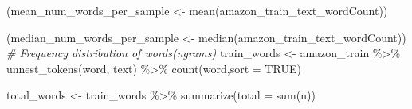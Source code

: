 \documentclass[
]{article}
\newenvironment{Shaded}{}{}
\newcommand{\AttributeTok}[1]{\textcolor[rgb]{0.49,0.56,0.16}{#1}}
\newcommand{\CommentTok}[1]{\textcolor[rgb]{0.38,0.63,0.69}{\textit{#1}}}
\newcommand{\ConstantTok}[1]{\textcolor[rgb]{0.53,0.00,0.00}{#1}}
\newcommand{\FunctionTok}[1]{\textcolor[rgb]{0.02,0.16,0.49}{#1}}
\newcommand{\NormalTok}[1]{#1}
\newcommand{\OtherTok}[1]{\textcolor[rgb]{0.00,0.44,0.13}{#1}}
\newcommand{\SpecialCharTok}[1]{\textcolor[rgb]{0.25,0.44,0.63}{#1}}
\begin{document}
\begin{Shaded}
\begin{Highlighting}[]
\NormalTok{(mean\_num\_words\_per\_sample }\OtherTok{\textless{}{-}} \FunctionTok{mean}\NormalTok{(amazon\_train\_text\_wordCount))}

\NormalTok{(median\_num\_words\_per\_sample }\OtherTok{\textless{}{-}} \FunctionTok{median}\NormalTok{(amazon\_train\_text\_wordCount))}
\CommentTok{\# Frequency distribution of words(ngrams)}
\NormalTok{train\_words }\OtherTok{\textless{}{-}}\NormalTok{ amazon\_train }\SpecialCharTok{\%\textgreater{}\%} \FunctionTok{unnest\_tokens}\NormalTok{(word, text) }\SpecialCharTok{\%\textgreater{}\%} \FunctionTok{count}\NormalTok{(word,}\AttributeTok{sort =} \ConstantTok{TRUE}\NormalTok{)}

\NormalTok{total\_words }\OtherTok{\textless{}{-}}\NormalTok{ train\_words }\SpecialCharTok{\%\textgreater{}\%}
    \FunctionTok{summarize}\NormalTok{(}\AttributeTok{total =} \FunctionTok{sum}\NormalTok{(n))}


\end{Highlighting}
\end{Shaded}
\end{document}

